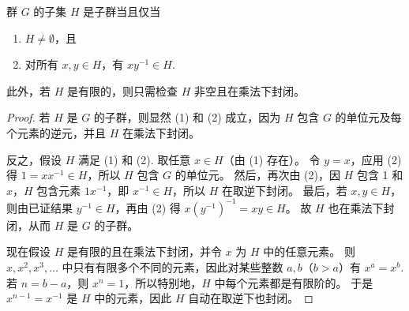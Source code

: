 \begin{proposition}
群 \( G \) 的子集 \( H \) 是子群当且仅当
\begin{enumerate}[label=(\arabic*)]
\item \( H \neq \emptyset \)，且
\item 对所有 \( x, y \in H \)，有 \( xy^{-1} \in H \).
\end{enumerate}
此外，若 \( H \) 是有限的，则只需检查 \( H \) 非空且在乘法下封闭。
\end{proposition}

\begin{proof}
若 \( H \) 是 \( G \) 的子群，则显然 (1) 和 (2) 成立，因为 \( H \) 包含 \( G \) 的单位元及每个元素的逆元，并且 \( H \) 在乘法下封闭。

反之，假设 \( H \) 满足 (1) 和 (2). 
取任意 \( x \in H \)（由 (1) 存在）。
令 \( y = x \)，应用 (2) 得 \( 1 = xx^{-1} \in H \)，所以 \( H \) 包含 \( G \) 的单位元。
然后，再次由 (2)，因 \( H \) 包含 1 和 \( x \)，\( H \) 包含元素 \( 1x^{-1} \)，即 \( x^{-1} \in H \)，所以 \( H \) 在取逆下封闭。
最后，若 \( x, y \in H \)，则由已证结果 \( y^{-1} \in H \)，再由 (2) 得 \( x(y^{-1})^{-1} = xy \in H \)。
故 \( H \) 也在乘法下封闭，从而 \( H \) 是 \( G \) 的子群。

现在假设 \( H \) 是有限的且在乘法下封闭，并令 \( x \) 为 \( H \) 中的任意元素。
则 \( x, x^2, x^3, \ldots \) 中只有有限多个不同的元素，因此对某些整数 \( a, b \)（\( b > a \)）有 \( x^a = x^b \). 若 \( n = b - a \)，则 \( x^n = 1 \)，所以特别地，\( H \) 中每个元素都是有限阶的。
于是 \( x^{n-1} = x^{-1} \) 是 \( H \) 中的元素，因此 \( H \) 自动在取逆下也封闭。
\end{proof}


